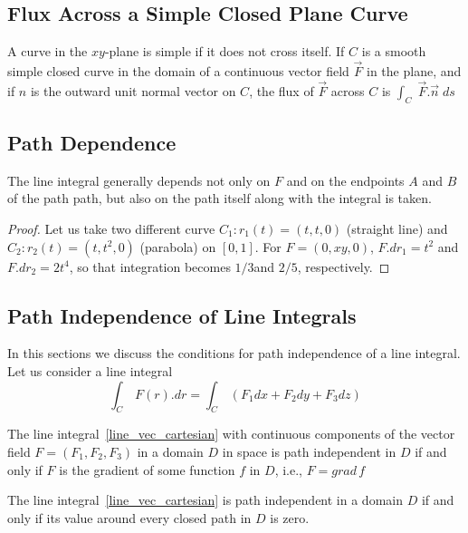 \documentclass[aima331_lecturenotes_ku.tex]{subfiles}
\begin{document}
\subsection{Flux Across a Simple Closed Plane Curve}
A curve in the $xy$-plane is simple if it does not cross itself. If $C$ is a smooth simple closed curve in the domain of a continuous vector field $\vec{F}$ in the plane, and if $n$ is the outward unit normal vector on $C$, the flux of $\vec{F}$ across $C$ is $\displaystyle \int_C\; \vec{F}.\vec{n}\;ds$


\subsection{Path Dependence}
\begin{theorem}
  The line integral generally depends not only on $F$ and on the endpoints $A$ and $B$ of the path path, but also on the path itself along with the integral is taken.
\end{theorem}
\begin{proof}
  Let us take two different curve $C_1: r_1(t)=(t,t,0)$ (straight line)  and $C_2:r_2(t)=(t,t^2,0)$ (parabola) on $[0,1]$. For $F=(0,xy,0)$, $F.dr_1 = t^2$ and $F.dr_2 = 2t^4$, so that integration becomes $1/3$and $2/5$, respectively.
\end{proof}

\subsection{Path Independence of Line Integrals}
In this sections we discuss the conditions for path independence of a line integral.
Let us consider a line integral
\begin{equation}
  \label{line_vec_cartesian}
  \displaystyle \int_C\, F(r).dr=\int_C\,(F_1dx + F_2dy + F_3dz)
\end{equation}
\begin{theorem}
  The line integral~\ref{line_vec_cartesian} with continuous components of the vector field $F=(F_1, F_2, F_3)$ in a domain $D$ in space is path independent in $D$ if and only if $F$ is the gradient of some function $f$ in $D$, i.e., $F=grad \,f$
\end{theorem}

\begin{theorem}
  The line integral~\ref{line_vec_cartesian} is path independent in a domain $D$ if and only if its value around every closed path in $D$ is zero.
\end{theorem}
\end{document}

